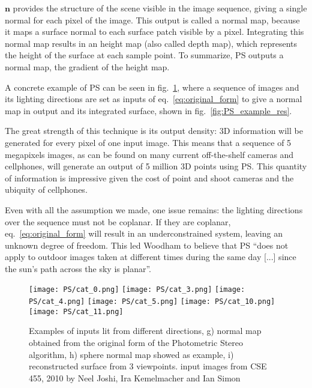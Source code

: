 $\mathbf{n}$ provides the structure of the scene visible in the image sequence, giving a single normal for each pixel of the image. This output is called a normal map, because it maps a surface normal to each surface patch visible by a pixel. Integrating this normal map results in an height map (also called depth map), which represents the height of the surface at each sample point. To summarize, PS outputs a normal map, the gradient of the height map.

A concrete example of PS can be seen in fig.~\ref{fig:PS_example}, where a sequence of images and its lighting directions are set as inputs of eq.~\eqref{eq:original_form} to give a normal map in output and its integrated surface, shown in fig.~\ref{fig:PS_example_res}.

The great strength of this technique is its output density: 3D information will be generated for every pixel of one input image. This means that a sequence of 5 megapixels images, as can be found on many current off-the-shelf cameras and cellphones, will generate an output of 5 million 3D points using PS. This quantity of information is impressive given the cost of point and shoot cameras and the ubiquity of cellphones.

Even with all the assumption we made, one issue remains: the lighting directions over the sequence must not be coplanar. If they are coplanar, eq.~\ref{eq:original_form} will result in an underconstrained system, leaving an unknown degree of freedom. This led Woodham to believe that PS ``does not apply to outdoor images taken at different times during the same day [...] since the sun's path across the sky is planar''.


\begin{figure}
\centering
\texttt{[image: PS/cat\_0.png]}
\texttt{[image: PS/cat\_3.png]}
\texttt{[image: PS/cat\_4.png]}
\texttt{[image: PS/cat\_5.png]}
\texttt{[image: PS/cat\_10.png]}
\texttt{[image: PS/cat\_11.png]}
\caption{Examples of inputs lit from different directions, g) normal map obtained from the original form of the Photometric Stereo algorithm, h) sphere normal map showed as example, i) reconstructed surface from 3 viewpoints.\newline
{\small input images from CSE 455, 2010 by Neel Joshi, Ira Kemelmacher and Ian Simon}
}
\label{fig:PS_example}
\end{figure}

